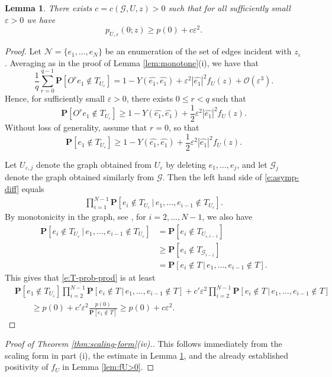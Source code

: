 \documentclass[11pt]{article}
\newtheorem{lemma}[theorem]{Lemma}
\theoremstyle{remark}
\def\eps{\varepsilon}
\def\cG{\mathcal{G}}
\def\cN{\mathcal{N}}
\newcommand{\eqn}[2]{\begin{equation}\label{#1}#2\end{equation}}
\newcommand{\eqnspl}[2]{\begin{equation}\begin{split}\label{#1}%
   #2\end{split}\end{equation}}
\newcommand{\eqnsplst}[1]{\begin{equation*}\begin{split}%
   #1\end{split}\end{equation*}}
\begin{document}
\begin{lemma}
\label{lem:asymp-diff}
There exists $c = c(\cG,U,z) > 0$ such that for all sufficiently small $\eps > 0$ we have
\eqn{e:asymp-diff}
{ p_{U,\eps}(0;z) 
  \ge p(0) + c \eps^2. }
\end{lemma}

\begin{proof}
Let $\cN = \{ e_1, \dots, e_N \}$ be an enumeration of the set of edges incident with $z_\eps$.
Averaging as in the proof of Lemma \ref{lem:monotone}(i), we have that
\[ \frac{1}{q} \sum_{r=0}^{q-1} \mathbf{P} [O^r e_1 \not\in T_{U_\eps}]
   = 1 - Y(\hat{e_1}, \hat{e_1}) + \eps^2 |\hat{e_1}|^2 f_U(z)
     + \mathcal{O}(\eps^3). \]
Hence, for sufficiently small $\eps > 0$, there exists $0 \le r < q$ such that 
\[ \mathbf{P} [O^r e_1 \not\in T_{U_\eps}]
   \ge 1 - Y(\hat{e_1}, \hat{e_1}) + \frac{1}{2} \eps^2 |\hat{e_1}|^2 f_U(z). \]
Without loss of generality, assume that $r=0$, so that
\eqn{e:e_1-ineq}{
 \mathbf{P} [e_1 \not\in T_{U_\eps}]
   \ge 1 - Y(\hat{e_1}, \hat{e_1}) + \frac{1}{2} \eps^2 |\hat{e_1}|^2 f_U(z). }

Let $U_{\eps,j}$ denote the graph obtained from $U_\eps$ by deleting $e_1, \dots, e_j$,
and let $\cG_j$ denote the graph obtained similarly from $\cG$. 
Then the left hand side of \eqref{e:asymp-diff} equals
\eqnspl{e:T-prob-prod}{
  \prod_{i=1}^{N-1} \mathbf{P} [ e_i \not\in T_{U_\eps} \,|\, e_1, \dots, e_{i-1} \not\in T_{U_\eps} ]. }
By monotonicity in the graph, see \cite[Lemma 10.3]{LyonsTrees}, for $i = 2, \dots, N-1$, we also have 
\eqnsplst{
  \mathbf{P} [ e_i \not\in T_{U_\eps} \,|\, e_1, \dots, e_{i-1} \not\in T_{U_\eps} ]
  &= \mathbf{P} [ e_i \not\in T_{U_{\eps,i-1}} ] \\
  &\ge \mathbf{P} [ e_i \not\in T_{\cG_{i-1}} ] \\
  &= \mathbf{P} [ e_i \not\in T \,|\, e_1, \dots, e_{i-1} \not\in T ]. }
This gives that \eqref{e:T-prob-prod} is at least
\eqnsplst{
  &\mathbf{P} [ e_1 \not\in T_{U_\eps} ] \prod_{i=2}^{N-1} \mathbf{P} [ e_i \not\in T \,|\, e_1, \dots, e_{i-1} \not\in T ]
  + c' \eps^2 \prod_{i=2}^{N-1} \mathbf{P} [ e_i \not\in T \,|\, e_1, \dots, e_{i-1} \not\in T ] \\
  &\qquad \ge p(0) + c' \eps^2 \frac{p(0)}{\mathbf{P} [e_1 \not\in T]}
  \ge p(0) + c \eps^2. }
\end{proof}

\begin{proof}[Proof of Theorem \ref{thm:scaling-form}(iv).]
This follows immediately from the scaling form in part (i), the estimate in Lemma \ref{lem:asymp-diff}, 
and the already established positivity of $f_U$ in Lemma \ref{lem:fU>0}.
\end{proof}
\end{document}
